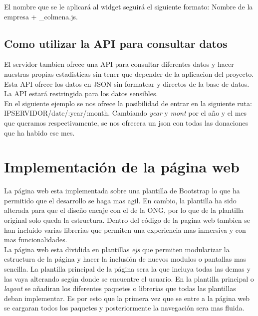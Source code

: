 El nombre que se le aplicará al widget seguirá el siguiente formato: Nombre de la empresa + \_colmena.js. \\



\subsection{Como utilizar la API para consultar datos}
El servidor tambien ofrece una API para consultar diferentes datos y hacer nuestras propias estadisticas sin tener que depender de la aplicacion del proyecto. Esta API ofrece los datos en JSON sin formatear y directos de la base de datos. La API estará restringida para los datos sensibles.\\

En el siguiente ejemplo se nos ofrece la posibilidad de entrar en la siguiente ruta: IPSERVIDOR/date/:year/:month. Cambiando \textit{year} y \textit{mont} por el año y el mes que queramos respectivamente, se nos ofrecera un json con todas las donaciones que ha habido ese mes.\\


\section{Implementación de la página web}
La página web esta implementada sobre una plantilla de Bootstrap lo que ha permitido que el desarrollo se haga mas agil. En cambio, la plantilla ha sido alterada para que el diseño encaje con el de la ONG, por lo que de la plantilla original solo queda la estructura. Dentro del código de la pagina web tambien se han incluido varias librerias que permiten una experiencia mas inmersiva y con mas funcionalidades. \\

La página web esta dividida en plantillas \textit{ejs} que permiten modularizar la estructura de la página y hacer la inclusión de nuevos modulos o pantallas mas sencilla. La plantilla principal de la página sera la que incluya todas las demas y las vaya alterando según donde se encuentre el usuario. En la plantilla principal o \textit{layout} se añadiran los diferentes paquetes o librerias que todas las plantillas deban implementar. Es por esto que la primera vez que se entre a la página web se cargaran todos los paquetes y posteriormente la navegación sera mas fluida.\\

